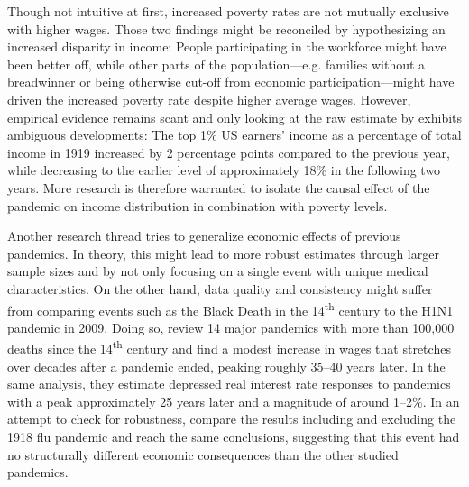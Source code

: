 \documentclass[12pt,a4paper]{article}
\begin{document}
Though not intuitive at first, increased poverty rates are not mutually exclusive with higher wages.
Those two findings might be reconciled by hypothesizing an increased disparity in income:
People participating in the workforce might have been better off, while other parts of the population---e.g. families without a breadwinner or being otherwise cut-off from economic participation---might have driven the increased poverty rate despite higher average wages.
However, empirical evidence remains scant and only looking at the raw estimate by \cite{pikettyDistributionalNationalAccounts2018} exhibits ambiguous developments:
The top 1\% US earners' income as a percentage of total income in 1919 increased by 2 percentage points compared to the previous year, while decreasing to the earlier level of approximately 18\% in the following two years.
More research is therefore warranted to isolate the causal effect of the pandemic on income distribution in combination with poverty levels.

Another research thread tries to generalize economic effects of previous pandemics.
In theory, this might lead to more robust estimates through larger sample sizes and by not only focusing on a single event with unique medical characteristics.
On the other hand, data quality and consistency might suffer from comparing events such as the Black Death in the 14\textsuperscript{th} century to the H1N1 pandemic in 2009.
Doing so, \cite{jordaLongerrunEconomicConsequences2020} review 14 major pandemics with more than 100,000 deaths since the 14\textsuperscript{th} century and find a modest increase in wages that stretches over decades after a pandemic ended, peaking roughly 35--40 years later.
In the same analysis, they estimate depressed real interest rate responses to pandemics with a peak approximately 25 years later and a magnitude of around 1--2\%.
In an attempt to check for robustness, \cite{jordaLongerrunEconomicConsequences2020} compare the results including and excluding the 1918 flu pandemic and reach the same conclusions, suggesting that this event had no structurally different economic consequences than the other studied pandemics.
\end{document}
